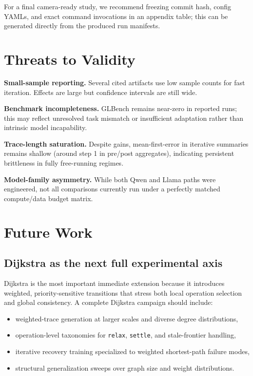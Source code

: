 \documentclass[sigplan,screen]{acmart}
\begin{document}
For a final camera-ready study, we recommend freezing commit hash, config YAMLs, and exact command invocations in an appendix table; this can be generated directly from the produced run manifests.

\section{Threats to Validity}
\textbf{Small-sample reporting.}
Several cited artifacts use low sample counts for fast iteration.
Effects are large but confidence intervals are still wide.

\textbf{Benchmark incompleteness.}
GLBench remains near-zero in reported runs; this may reflect unresolved task mismatch or insufficient adaptation rather than intrinsic model incapability.

\textbf{Trace-length saturation.}
Despite gains, mean-first-error in iterative summaries remains shallow (around step 1 in pre/post aggregates), indicating persistent brittleness in fully free-running regimes.

\textbf{Model-family asymmetry.}
While both Qwen and Llama paths were engineered, not all comparisons currently run under a perfectly matched compute/data budget matrix.

\section{Future Work}
\subsection{Dijkstra as the next full experimental axis}
Dijkstra is the most important immediate extension because it introduces weighted, priority-sensitive transitions that stress both local operation selection and global consistency.
A complete Dijkstra campaign should include:
\begin{itemize}
  \item weighted-trace generation at larger scales and diverse degree distributions,
  \item operation-level taxonomies for \texttt{relax}, \texttt{settle}, and stale-frontier handling,
  \item iterative recovery training specialized to weighted shortest-path failure modes,
  \item structural generalization sweeps over graph size and weight distributions.
\end{itemize}
\end{document}
